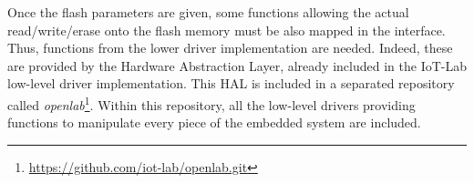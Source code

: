 Once the flash parameters are given, some functions allowing the actual read/write/erase onto the flash memory must be also mapped in the interface.
Thus, functions from the lower driver implementation are needed.
Indeed, these are provided by the Hardware Abstraction Layer, already included in the IoT-Lab low-level driver implementation.
This HAL is included in a separated repository called \textit{openlab}\footnote{\url{https://github.com/iot-lab/openlab.git}}.
Within this repository, all the low-level drivers providing functions to manipulate every piece of the embedded system are included.

